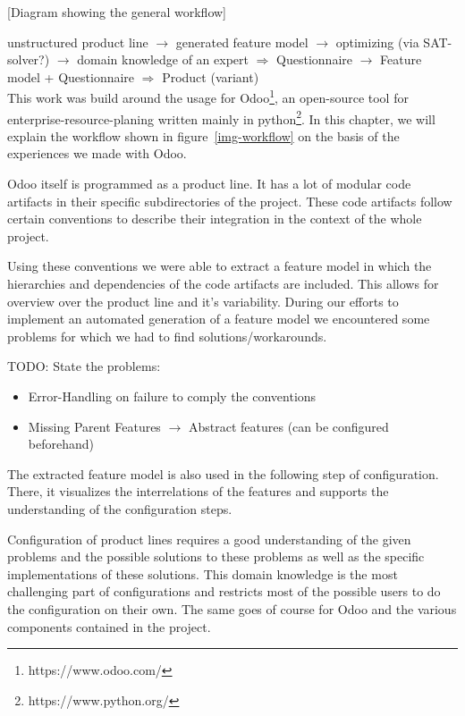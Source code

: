 [Diagram showing the general workflow]


unstructured product line $\rightarrow$ generated feature model $\rightarrow$ optimizing (via SAT-solver?) $\rightarrow$ domain knowledge of an expert $\Rightarrow$ Questionnaire $\rightarrow$ Feature model + Questionnaire $\Rightarrow$ Product (variant)\\

This work was build around the usage for Odoo\footnote{https://www.odoo.com/}, an open-source tool for enterprise-resource-planing written mainly in python\footnote{https://www.python.org/}. In this chapter, we will explain the workflow shown in figure~\ref{img-workflow} on the basis of the experiences we made with Odoo.

Odoo itself is programmed as a product line. It has a lot of modular code artifacts in their specific subdirectories of the project. These code artifacts follow certain conventions to describe their integration in the context of the whole project.

Using these conventions we were able to extract a feature model in which the hierarchies and dependencies of the code artifacts are included. This allows for overview over the product line and it's variability. During our efforts to implement an automated generation of a feature model we encountered some problems for which we had to find solutions/workarounds.

{\color{red}TODO: State the problems:
\begin{itemize}
\item Error-Handling on failure to comply the conventions
\item Missing Parent Features $\rightarrow$ Abstract features (can be configured beforehand)
\end{itemize}}

The extracted feature model is also used in the following step of configuration. There, it visualizes the interrelations of the features and supports the understanding of the configuration steps.

Configuration of product lines requires a good understanding of the given problems and the possible solutions to these problems as well as the specific implementations of these solutions. This domain knowledge is the most challenging part of configurations and restricts most of the possible users to do the configuration on their own. The same goes of course for Odoo and the various components contained in the project.

